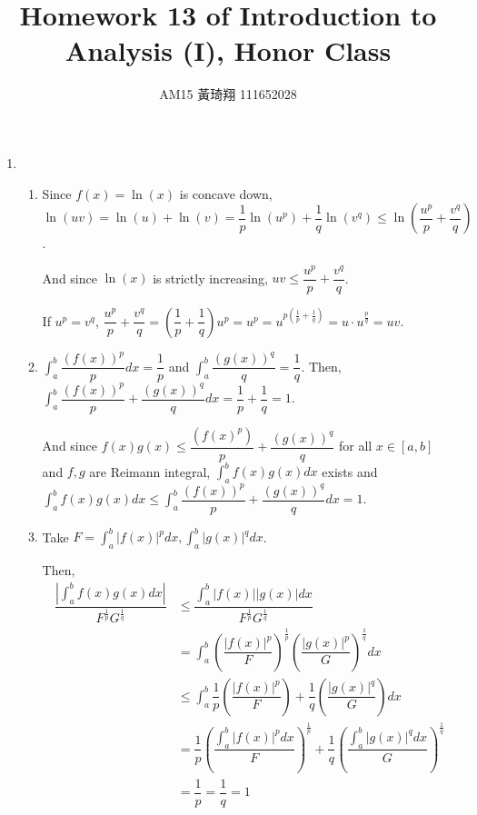 \documentclass[12pt]{article}
\title{Homework 13 of Introduction to Analysis (I), Honor Class}
\author{AM15 黃琦翔 111652028}
\begin{document}
\maketitle
\begin{enumerate}
    \item \begin{enumerate}
        \item Since $f(x) = \ln(x)$ is concave down, $\ln(uv) = \ln(u) + \ln(v) = \dfrac{1}{p}\ln(u^p) + \dfrac{1}{q}\ln(v^q) \leq \ln(\dfrac{u^p}{p} + \dfrac{v^q}{q})$.
        
        And since $\ln(x)$ is strictly increasing, $uv \leq \dfrac{u^p}{p} + \dfrac{v^q}{q}$.

        If $u^p = v^q$, $\dfrac{u^p}{p} + \dfrac{v^q}{q} = (\dfrac{1}{p} + \dfrac{1}{q}) u^p = u^p = u^{p(\frac{1}{p} + \frac{1}{q})} = u\cdot u^{\frac{p}{q}} = uv$.

        \item $\displaystyle\int_a^b \dfrac{(f(x))^p}{p} dx= \dfrac{1}{p}$ and $\displaystyle\int_a^b \dfrac{(g(x))^q}{q} = \dfrac{1}{q}$.
        Then, $\displaystyle\int_a^b \dfrac{(f(x))^p}{p} + \dfrac{(g(x))^q}{q} dx = \dfrac{1}{p} + \dfrac{1}{q} = 1$.

        And since $f(x)g(x) \leq \dfrac{(f(x)^p)}{p} + \dfrac{(g(x))^q}{q}$ for all $x\in [a, b]$ and $f, g$ are Reimann integral,
        $\displaystyle\int_a^b f(x)g(x) dx$ exists and $\displaystyle\int_a^b f(x) g(x) dx \leq \displaystyle\int_a^b \dfrac{(f(x))^p}{p} + \dfrac{(g(x))^q}{q} dx = 1$.

        \item Take $F = \displaystyle\int_a^b |f(x)|^p dx, \displaystyle\int_a^b |g(x)|^q dx$.
        
        Then, \begin{align*}
            \dfrac{|\int_a^b f(x)g(x) dx|}{F^{\frac{1}{p}}G^{\frac{1}{q}}} &\leq \dfrac{\int_a^b |f(x)||g(x)| dx}{F^\frac{1}{p}G^{\frac{1}{q}}}\\
            &= \int_a^b (\dfrac{|f(x)|^p}{F})^{\frac{1}{p}} (\dfrac{|g(x)|^p}{G})^{\frac{1}{q}} dx\\
            &\leq \int_a^b \dfrac{1}{p}(\dfrac{|f(x)|^p}{F})+ \dfrac{1}{q}(\dfrac{|g(x)|^q}{G}) dx\\
            &=\dfrac{1}{p} (\dfrac{\int_a^b |f(x)|^p dx}{F})^{\frac{1}{p}} + \dfrac{1}{q}(\dfrac{\int_a^b |g(x)|^q dx}{G})^{\frac{1}{q}}\\
            &= \dfrac{1}{p} = \dfrac{1}{q} = 1
        \end{align*}


\end{enumerate}
\end{enumerate}
\end{document}
